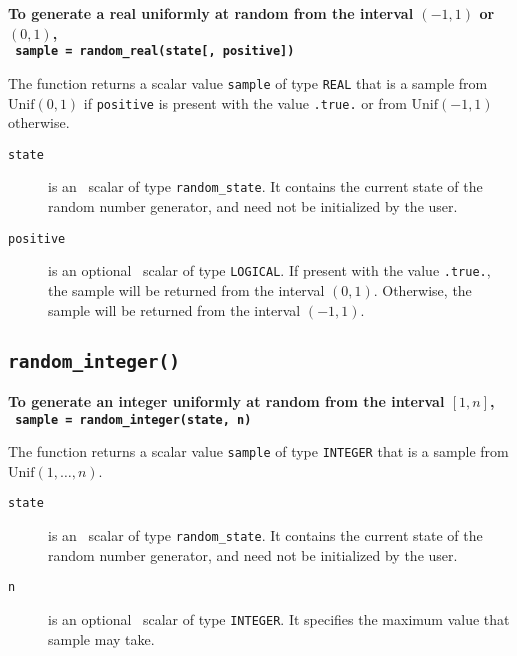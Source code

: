 \textbf{\noindent
   To generate a real uniformly at random from the interval $(-1,1)$ or $(0,1)$,
   \vspace*{0.1cm} \\
   \texttt{ \hspace*{0.2cm}
      sample = random\_real(state[, positive])
   }
   \vspace{0.3cm}
}

\noindent
The function returns a scalar value {\tt sample} of type {\tt REAL} that is a
sample from $\mathrm{Unif}(0,1)$ if {\tt positive} is present with the value
{\tt .true.} or from $\mathrm{Unif}(-1,1)$ otherwise.

\begin{description}

\item[\texttt{state}] is an \intentinout\ scalar of
type  {\tt random\_state}. It contains the current state of the random number
generator, and need not be initialized by the user.

\item[\texttt{positive}] is an optional \intentin\ scalar of type {\tt LOGICAL}.
   If present with the value {\tt .true.}, the sample will be returned from
   the interval $(0,1)$. Otherwise, the sample will be returned from the
   interval $(-1,1)$.

\end{description}

\subsection{\texttt{random\_integer()}}

\textbf{\noindent
   To generate an integer uniformly at random from the interval $[1,n]$,
   \vspace*{0.1cm} \\
   \texttt{ \hspace*{0.2cm}
      sample = random\_integer(state, n)
   }
   \vspace{0.3cm}
}

\noindent
The function returns a scalar value {\tt sample} of type {\tt INTEGER} that is a
sample from $\mathrm{Unif}(1, \ldots, n)$.

\begin{description}

\item[\texttt{state}] is an \intentinout\ scalar of
type  {\tt random\_state}. It contains the current state of the random number
generator, and need not be initialized by the user.

\item[\texttt{n}] is an optional \intentin\ scalar of type {\tt INTEGER}.
   It specifies the maximum value that sample may take.

\end{description}

